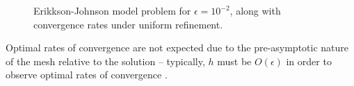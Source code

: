 \begin{figure}[!h]
\centering
{}
\caption{Erikkson-Johnson model problem for $\epsilon = 10^{-2}$, along with convergence rates under uniform refinement.}
\label{fig:erikkson}
\end{figure}
Optimal rates of convergence are not expected due to the pre-asymptotic nature of the mesh relative to the solution -- typically, $h$ must be $O(\epsilon)$ in order to observe optimal rates of convergence \cite{SchwabBoundaryLayers}.  

